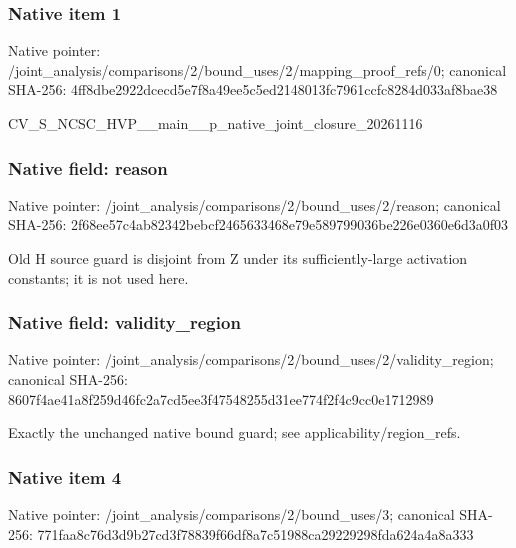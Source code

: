 \documentclass[10pt,a4paper]{article}
\begin{document}
\subsubsection{Native item 1}
Native pointer: /joint\_\allowbreak{}analysis/comparisons/2/bound\_\allowbreak{}uses/2/mapping\_\allowbreak{}proof\_\allowbreak{}refs/0; canonical SHA-256: 4ff8dbe2922dcecd5e7f8a49ee5c5ed2148013fc7961ccfc8284d033af8bae38

\begingroup\raggedright\sloppy CV\_\allowbreak{}S\_\allowbreak{}NCSC\_\allowbreak{}HVP\_\allowbreak{}\_\allowbreak{}main\_\allowbreak{}\_\allowbreak{}p\_\allowbreak{}native\_\allowbreak{}joint\_\allowbreak{}closure\_\allowbreak{}20261116\par\endgroup

\subsubsection{Native field: reason}
Native pointer: /joint\_\allowbreak{}analysis/comparisons/2/bound\_\allowbreak{}uses/2/reason; canonical SHA-256: 2f68ee57c4ab82342bebcf2465633468e79e589799036be226e0360e6d3a0f03

\begingroup\raggedright\sloppy Old H source guard is disjoint from Z under its sufficiently-large activation constants;\allowbreak{} it is not used here.\par\endgroup

\subsubsection{Native field: validity\_\allowbreak{}region}
Native pointer: /joint\_\allowbreak{}analysis/comparisons/2/bound\_\allowbreak{}uses/2/validity\_\allowbreak{}region; canonical SHA-256: 8607f4ae41a8f259d46fc2a7cd5ee3f47548255d31ee774f2f4c9cc0e1712989

\begingroup\raggedright\sloppy Exactly the unchanged native bound guard;\allowbreak{} see applicability/\allowbreak{}region\_\allowbreak{}refs.\par\endgroup

\subsubsection{Native item 4}
Native pointer: /joint\_\allowbreak{}analysis/comparisons/2/bound\_\allowbreak{}uses/3; canonical SHA-256: 771faa8c76d3d9b27cd3f78839f66df8a7c51988ca29229298fda624a4a8a333
\end{document}
